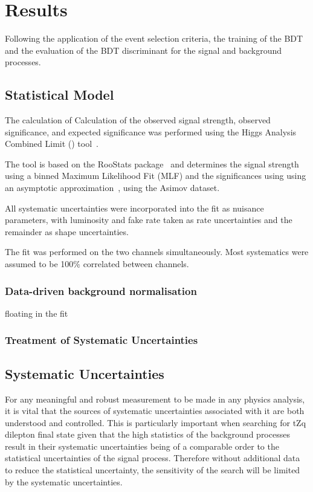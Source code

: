 \chapter{Results}\label{chapter:results}
Following the application of the event selection criteria, the training of the BDT and the evaluation of the BDT discriminant for the signal and background processes.


\section{Statistical Model}\label{sec:statisticalModel}
The calculation of 
Calculation of the observed signal strength, observed significance, and expected significance was performed  using the Higgs Analysis Combined Limit (\combine) tool~\cite{Combine}. 

The \combine tool is based on the RooStats package~\cite{Moneta:2010pm,Schott:2012zb} and determines the signal strength using a binned Maximum Likelihood Fit (MLF) and the significances using using an asymptotic approximation~\cite{AsymptoticFormulae}, using the Asimov dataset.



All systematic uncertainties were incorporated into the fit as nuisance parameters, with luminosity and fake rate taken as rate uncertainties and the remainder as shape uncertainties.
 
The fit was performed on the two channels simultaneously. 
Most systematics were assumed to be 100\% correlated between channels.

\subsection{Data-driven background normalisation}\label{subsec:combineNormalisation}

floating in the fit
\subsection{Treatment of Systematic Uncertainties}\label{subsec:combineNormalisation}


\section{Systematic Uncertainties}\label{chapter:systematics}
For any meaningful and robust measurement to be made in any physics analysis, it is vital that the sources of systematic uncertainties associated with it are both understood and controlled.
This is particularly important when searching for tZq dilepton final state given that the high statistics of the background processes result in their systematic uncertainties being of a comparable order to the statistical uncertainties of the signal process.
Therefore without additional data to reduce the statistical uncertainty, the sensitivity of the search will be limited by the systematic uncertainties.


